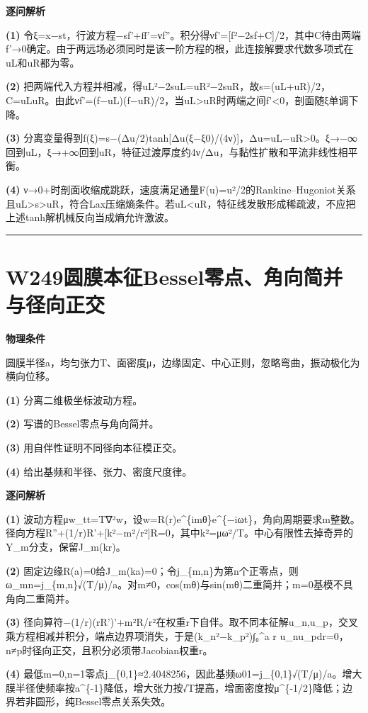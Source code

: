 \documentclass[UTF8,a4paper,11pt,oneside,openany]{ctexbook}
\begin{document}
\par\medskip\noindent\textbf{逐问解析}
\par\noindent\textbf{(1)} 令ξ=x−st，行波方程−sf'+ff'=νf''。积分得νf'=[f²−2sf+C]/2，其中C待由两端f'→0确定。由于两远场必须同时是该一阶方程的根，此连接解要求代数多项式在uL和uR都为零。
\par\noindent\textbf{(2)} 把两端代入方程并相减，得uL²−2suL=uR²−2suR，故s=(uL+uR)/2，C=uLuR。由此νf'=(f−uL)(f−uR)/2，当uL>uR时两端之间f'<0，剖面随ξ单调下降。
\par\noindent\textbf{(3)} 分离变量得到f(ξ)=s−(Δu/2)tanh[Δu(ξ−ξ0)/(4ν)]，Δu=uL−uR>0。ξ→−∞回到uL，ξ→+∞回到uR，特征过渡厚度约4ν/Δu，与黏性扩散和平流非线性相平衡。
\par\noindent\textbf{(4)} ν→0+时剖面收缩成跳跃，速度满足通量F(u)=u²/2的Rankine–Hugoniot关系且uL>s>uR，符合Lax压缩熵条件。若uL<uR，特征线发散形成稀疏波，不应把上述tanh解机械反向当成熵允许激波。

\par\bigskip\hrule\bigskip
\section*{W249\quad 圆膜本征Bessel零点、角向简并与径向正交}
\textbf{物理条件}\par 圆膜半径a，均匀张力T、面密度μ，边缘固定、中心正则，忽略弯曲，振动极化为横向位移。
\par\noindent\textbf{(1)} 分离二维极坐标波动方程。
\par\noindent\textbf{(2)} 写谱的Bessel零点与角向简并。
\par\noindent\textbf{(3)} 用自伴性证明不同径向本征模正交。
\par\noindent\textbf{(4)} 给出基频和半径、张力、密度尺度律。

\par\medskip\noindent\textbf{逐问解析}
\par\noindent\textbf{(1)} 波动方程μw\_tt=T∇²w，设w=R(r)e\textasciicircum{}\{imθ\}e\textasciicircum{}\{−iωt\}，角向周期要求m整数。径向方程R''+(1/r)R'+[k²−m²/r²]R=0，其中k²=μω²/T。中心有限性去掉奇异的Y\_m分支，保留J\_m(kr)。
\par\noindent\textbf{(2)} 固定边缘R(a)=0给J\_m(ka)=0；令j\_\{m,n\}为第n个正零点，则ω\_mn=j\_\{m,n\}√(T/μ)/a。对m≠0，cos(mθ)与sin(mθ)二重简并；m=0基模不具角向二重简并。
\par\noindent\textbf{(3)} 径向算符−(1/r)(rR')'+m²R/r²在权重r下自伴。取不同本征解u\_n,u\_p，交叉乘方程相减并积分，端点边界项消失，于是(k\_n²−k\_p²)∫₀\textasciicircum{}a r u\_nu\_pdr=0，n≠p时径向正交，且积分必须带Jacobian权重r。
\par\noindent\textbf{(4)} 最低m=0,n=1零点j\_\{0,1\}≈2.4048256，因此基频ω01=j\_\{0,1\}√(T/μ)/a。增大膜半径使频率按a\textasciicircum{}\{-1\}降低，增大张力按√T提高，增面密度按μ\textasciicircum{}\{-1/2\}降低；边界若非圆形，纯Bessel零点关系失效。
\end{document}
